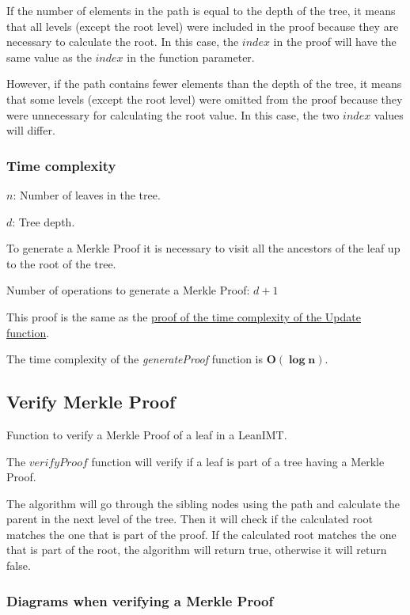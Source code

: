 \documentclass{article}
\begin{document}
If the number of elements in the path is equal to the depth of the tree, it means that all levels (except the root level) were included in the proof because they are necessary to calculate the root. In this case, the $index$ in the proof will have the same value as the $index$ in the function parameter.

However, if the path contains fewer elements than the depth of the tree, it means that some levels (except the root level) were omitted from the proof because they were unnecessary for calculating the root value. In this case, the two $index$ values will differ.


\subsubsection{Time complexity}

$n$: Number of leaves in the tree.

$d$: Tree depth.

To generate a Merkle Proof it is necessary to visit all the ancestors of the leaf up to the root of the tree.

Number of operations to generate a Merkle Proof: $d + 1$

This proof is the same as the \hyperref[UpdateTimeComplexity]{proof of the time complexity of the Update function}.

The time complexity of the \textit{generateProof} function is $\boldsymbol{O(\log n)}$.


\subsection{Verify Merkle Proof}

Function to verify a Merkle Proof of a leaf in a LeanIMT.

The $verifyProof$ function will verify if a leaf is part of a tree having a Merkle Proof.

The algorithm will go through the sibling nodes using the path and calculate the parent in the next level of the tree. Then it will check if the calculated root matches the one that is part of the proof.
If the calculated root matches the one that is part of the root, the algorithm will return true, otherwise it will return false.


\subsubsection*{Diagrams when verifying a Merkle Proof}
\end{document}
